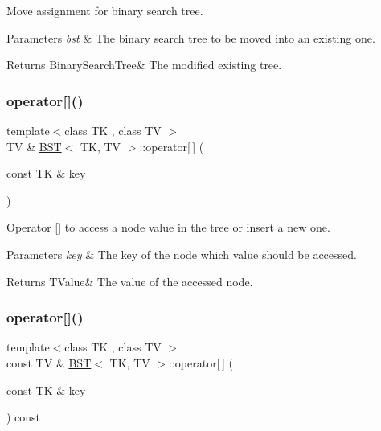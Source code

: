 Move assignment for binary search tree. 


\begin{DoxyParams}{Parameters}
{\em bst} & The binary search tree to be moved into an existing one. \\
\hline
\end{DoxyParams}
\begin{DoxyReturn}{Returns}
Binary\+Search\+Tree\& The modified existing tree. 
\end{DoxyReturn}
\mbox{\label{classBST_acc8b8d333853756891d31f14c2ea2259}} 
\subsubsection{\texorpdfstring{operator[]()}{operator[]()}\hspace{0.1cm}{\footnotesize\ttfamily [1/2]}}
{\footnotesize\ttfamily template$<$class TK , class TV $>$ \\
TV \& \hyperlink{classBST}{B\+ST}$<$ TK, TV $>$\+::operator\mbox{[}$\,$\mbox{]} (\begin{DoxyParamCaption}\item[{const TK \&}]{key }\end{DoxyParamCaption})}



Operator \mbox{[}\mbox{]} to access a node value in the tree or insert a new one. 


\begin{DoxyParams}{Parameters}
{\em key} & The key of the node which value should be accessed. \\
\hline
\end{DoxyParams}
\begin{DoxyReturn}{Returns}
T\+Value\& The value of the accessed node. 
\end{DoxyReturn}
\mbox{\label{classBST_a45730a0b118f4a29b0c336c06069b7a3}} 
\subsubsection{\texorpdfstring{operator[]()}{operator[]()}\hspace{0.1cm}{\footnotesize\ttfamily [2/2]}}
{\footnotesize\ttfamily template$<$class TK , class TV $>$ \\
const TV \& \hyperlink{classBST}{B\+ST}$<$ TK, TV $>$\+::operator\mbox{[}$\,$\mbox{]} (\begin{DoxyParamCaption}\item[{const TK \&}]{key }\end{DoxyParamCaption}) const}



